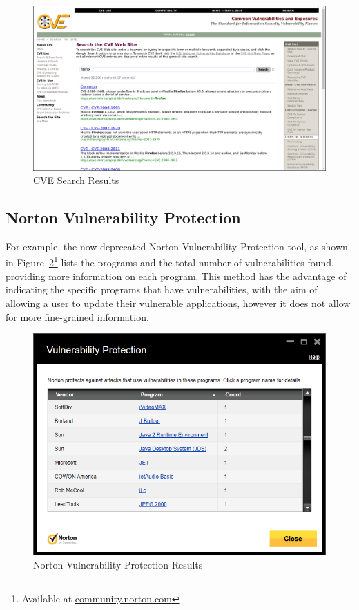 \begin{figure} \centering \includegraphics[width=0.9\linewidth]{cve-lookup} \caption{CVE Search Results}\label{fig:cve} \end{figure}

\subsection{Norton Vulnerability Protection}\label{sec:nor}

For example, the now deprecated Norton Vulnerability Protection tool, as shown
in Figure~\ref{fig:nort}\footnote{Available at \url{community.norton.com}}
lists the programs and the total number of  vulnerabilities found, providing
more information on each program.  This method has the advantage of indicating
the specific programs that have vulnerabilities, with the aim of allowing a
user to update their vulnerable applications, however it does not allow for
more fine-grained information.


\begin{figure}  \centering \includegraphics[width=0.9\linewidth]{norton-cve}

	 \caption{Norton Vulnerability Protection Results}\label{fig:nort}
\end{figure}

